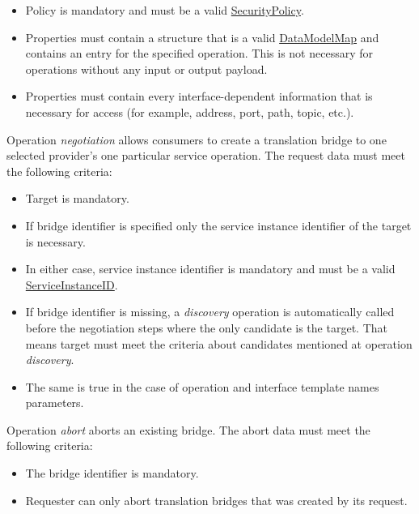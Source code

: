 \documentclass[a4paper]{arrowhead}
\newcommand{\pref}[1]{{\textcolor{ArrowheadGrey}{\hyperref[sec:model:primitives:#1]{#1}}}}
\begin{document}
\begin{itemize}
\begin{itemize}
\begin{itemize}
            \item Policy is mandatory and must be a valid \pref{SecurityPolicy}.
            \item Properties must contain a structure that is a valid \hyperref[sec:model:DataModelMap]{DataModelMap} and contains an entry for the specified operation. This is not necessary for operations without any input or output payload.
            \item Properties must contain every interface-dependent information that is necessary for access (for example, address, port, path, topic, etc.).
        \end{itemize}
    \end{itemize}
\end{itemize}


Operation \textit{negotiation} allows consumers to create a translation bridge to one selected provider's one particular service operation. The request data must meet the following criteria:

\begin{itemize}
    \item Target is mandatory.
    \item If bridge identifier is specified only the service instance identifier of the target is necessary.
    \item In either case, service instance identifier is mandatory and  must be a valid \pref{ServiceInstanceID}.
    \item If bridge identifier is missing, a \textit{discovery} operation is automatically called before the negotiation steps where the only candidate is the target. That means target must meet the criteria about candidates mentioned at operation \textit{discovery}. 
    \item The same is true in the case of operation and interface template names parameters.
\end{itemize}


Operation \textit{abort} aborts an existing bridge. The abort data must meet the following criteria:

\begin{itemize}
    \item The bridge identifier is mandatory.
    \item Requester can only abort translation bridges that was created by its request.
\end{itemize}
\end{document}
